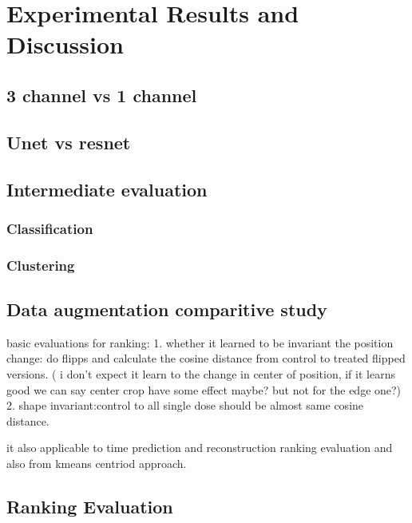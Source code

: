 \chapter{Experimental Results and Discussion} \label{chapter:experimental results and Discussion} 

\section{3 channel vs 1 channel}
\section{Unet vs resnet}



\section{Intermediate evaluation}
\subsection{Classification} \label{subsection:classification}

\subsection{Clustering} \label{subsection:kmeans}

\section{Data augmentation comparitive study}
basic evaluations for ranking:
1.
whether it learned to be invariant the position change:
do flipps and calculate the cosine distance from control to treated flipped versions. ( i don't expect it learn to the change in center of position, 
if it learns good we can say center crop have some effect maybe? but not for the edge one?)
2. 
shape invariant:control to all single dose should be almost same cosine distance.

it also applicable to time prediction and reconstruction ranking evaluation and also from kmeans centriod approach.



\section{Ranking Evaluation}



